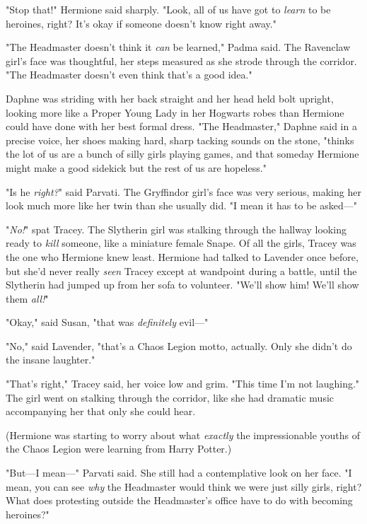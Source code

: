"Stop that!" Hermione said sharply. "Look, all of us have got to \emph{learn}
to be heroines, right? It's okay if someone doesn't know right away."

"The Headmaster doesn't think it \emph{can} be learned," Padma said. The
Ravenclaw girl's face was thoughtful, her steps measured as she strode through
the corridor. "The Headmaster doesn't even think that's a good idea."

Daphne was striding with her back straight and her head held bolt upright,
looking more like a Proper Young Lady in her Hogwarts robes than Hermione could
have done with her best formal dress. "The Headmaster," Daphne said in a
precise voice, her shoes making hard, sharp tacking sounds on the stone,
"thinks the lot of us are a bunch of silly girls playing games, and that
someday Hermione might make a good sidekick but the rest of us are hopeless."

"Is he \emph{right?}" said Parvati. The Gryffindor girl's face was very
serious, making her look much more like her twin than she usually did. "I mean
it has to be asked\mbox{---}"

"\emph{No!}" spat Tracey. The Slytherin girl was stalking through the hallway
looking ready to \emph{kill} someone, like a miniature female Snape. Of all the
girls, Tracey was the one who Hermione knew least. Hermione had talked to
Lavender once before, but she'd never really \emph{seen} Tracey except at
wandpoint during a battle, until the Slytherin had jumped up from her sofa to
volunteer. "We'll show him! We'll show them \emph{all!}"

"Okay," said Susan, "that was \emph{definitely} evil\mbox{---}"

"No," said Lavender, "that's a Chaos Legion motto, actually. Only she didn't do
the insane laughter."

"That's right," Tracey said, her voice low and grim. "This time I'm not
laughing." The girl went on stalking through the corridor, like she had
dramatic music accompanying her that only she could hear.

(Hermione was starting to worry about what \emph{exactly} the impressionable
youths of the Chaos Legion were learning from Harry Potter.)

"But---I mean\mbox{---}" Parvati said. She still had a contemplative look on her face.
"I mean, you can see \emph{why} the Headmaster would think we were just silly
girls, right? What does protesting outside the Headmaster's office have to do
with becoming heroines?"

